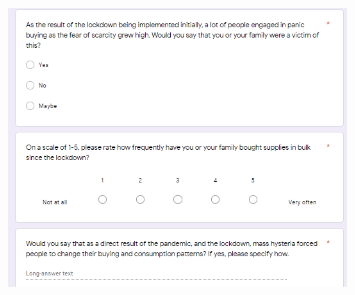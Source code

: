 \documentclass[runningheads]{llncs}
\begin{document}
\newpage
\begin{figure}
  \includegraphics[width=0.8\textwidth]{survey-pg4.PNG}
\end{figure}
\end{document}
